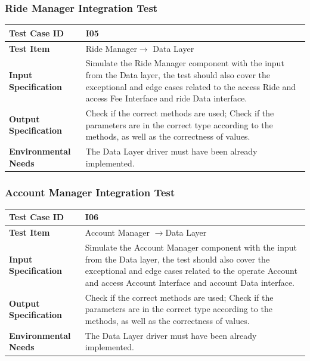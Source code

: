 \documentclass[a4paper,11pt]{article}
\begin{document}
		\subsubsection{Ride Manager Integration Test}
		\begin{table}[H] 
\begin{center}
\renewcommand\arraystretch{1.5}
\begin{tabular}{|p{5cm}|p{7cm}|}
 \hline
\textbf{Test Case ID}& I05\\
 \hline
\textbf{Test Item}&Ride Manager$\rightarrow$ Data Layer\\
 \hline
\textbf{Input Specification}&Simulate the Ride Manager component with the input from the Data layer, the test should also cover the exceptional and edge cases related to the access Ride and access Fee Interface and ride Data interface.\\
 \hline
\textbf{Output Specification}&Check if the correct methods are used;
Check if the parameters are in the correct type according to the methods, as well as the correctness of values.\\
 \hline
 \textbf{Environmental Needs}&The Data Layer driver must have been already implemented.\\
 \hline
\end{tabular}
\end{center}
\end{table}		
		\subsubsection{Account Manager Integration Test}
		\begin{table}[H] 
\begin{center}
\renewcommand\arraystretch{1.5}
\begin{tabular}{|p{5cm}|p{7cm}|}
 \hline
\textbf{Test Case ID}& I06\\
 \hline
\textbf{Test Item}&Account Manager $\rightarrow$Data Layer\\
 \hline
\textbf{Input Specification}&Simulate the Account Manager component with the input from the Data layer, the test should also cover the exceptional and edge cases related to the operate Account and access Account Interface and account Data interface.\\
 \hline
\textbf{Output Specification}&Check if the correct methods are used;
Check if the parameters are in the correct type according to the methods, as well as the correctness of values.\\
 \hline
 \textbf{Environmental Needs}&The Data Layer driver must have been already implemented.\\
 \hline
\end{tabular}
\end{center}
\end{table}		
\end{document}
